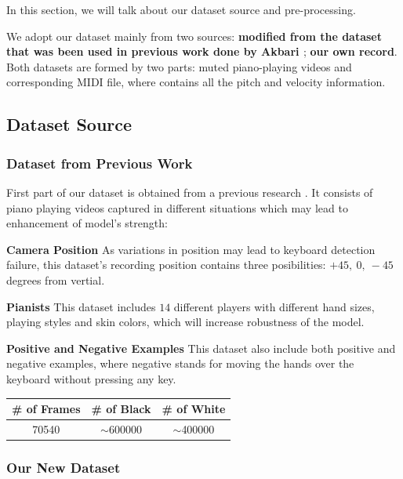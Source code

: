 \documentclass[10pt,twocolumn,letterpaper]{article}
\begin{document}
   In this section, we will talk about our dataset source and pre-processing.

   We adopt our dataset mainly from two sources: \textbf{modified from the dataset that was been used in previous work done by Akbari \cite{Akbari}}; \textbf{our own record}.
   Both datasets are formed by two parts: muted piano-playing videos and corresponding MIDI file, where contains all the pitch and velocity information.

\subsection{Dataset Source}

   \subsubsection{Dataset from Previous Work}

   First part of our dataset is obtained from a previous research \cite{Akbari}. It consists of piano playing videos captured in different situations which may lead to enhancement of model's strength:

   \textbf{Camera Position} As variations in position may lead to keyboard detection failure, this dataset's recording position contains three posibilities: $+45,\ 0,\ -45$ degrees from vertial.

   \textbf{Pianists} This dataset includes $14$ different players with different hand sizes, playing styles and skin colors, which will increase robustness of the model.

   \textbf{Positive and Negative Examples} This dataset also include both positive and negative examples, where negative stands for moving the hands over the keyboard without pressing any key.\\
   
   \begin{minipage}{0.9\linewidth}
      \centering
   \begin{tabular}{ccc}
      \toprule
      \# of Frames&\# of Black&\# of White\\
      \midrule
      70540 & $\sim$600000 & $\sim$400000\\
      \bottomrule
      \end{tabular}
       \label{tab:prevdataset} 
   \end{minipage}
      
   \subsubsection{Our New Dataset}
\end{document}
